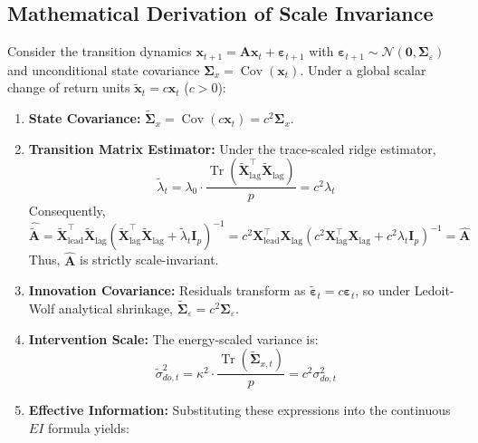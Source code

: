 \documentclass[12pt]{article}
\begin{document}
\subsection{Mathematical Derivation of Scale Invariance}
Consider the transition dynamics $\mathbf{x}_{t+1} = \mathbf{A}\mathbf{x}_t + \boldsymbol{\varepsilon}_{t+1}$ with $\boldsymbol{\varepsilon}_{t+1} \sim \mathcal{N}(\mathbf{0}, \boldsymbol{\Sigma}_\varepsilon)$ and unconditional state covariance $\boldsymbol{\Sigma}_x = \operatorname{Cov}(\mathbf{x}_t)$. Under a global scalar change of return units $\tilde{\mathbf{x}}_t = c \mathbf{x}_t$ ($c > 0$):
\begin{enumerate}
    \item \textbf{State Covariance:} $\tilde{\boldsymbol{\Sigma}}_x = \operatorname{Cov}(c \mathbf{x}_t) = c^2 \boldsymbol{\Sigma}_x$.
    \item \textbf{Transition Matrix Estimator:} Under the trace-scaled ridge estimator,
    \begin{equation}
    \tilde{\lambda}_t = \lambda_0 \cdot \frac{\operatorname{Tr}(\tilde{\mathbf{X}}_{\text{lag}}^\top \tilde{\mathbf{X}}_{\text{lag}})}{p} = c^2 \lambda_t
    \end{equation}
    Consequently,
    \begin{equation}
    \hat{\tilde{\mathbf{A}}} = \tilde{\mathbf{X}}_{\text{lead}}^\top \tilde{\mathbf{X}}_{\text{lag}} \left( \tilde{\mathbf{X}}_{\text{lag}}^\top \tilde{\mathbf{X}}_{\text{lag}} + \tilde{\lambda}_t \mathbf{I}_p \right)^{-1} = c^2 \mathbf{X}_{\text{lead}}^\top \mathbf{X}_{\text{lag}} \left( c^2 \mathbf{X}_{\text{lag}}^\top \mathbf{X}_{\text{lag}} + c^2 \lambda_t \mathbf{I}_p \right)^{-1} = \hat{\mathbf{A}}
    \end{equation}
    Thus, $\hat{\mathbf{A}}$ is strictly scale-invariant.
    \item \textbf{Innovation Covariance:} Residuals transform as $\tilde{\boldsymbol{\varepsilon}}_t = c \boldsymbol{\varepsilon}_t$, so under Ledoit-Wolf analytical shrinkage, $\tilde{\boldsymbol{\Sigma}}_\varepsilon = c^2 \boldsymbol{\Sigma}_\varepsilon$.
    \item \textbf{Intervention Scale:} The energy-scaled variance is:
    \begin{equation}
    \tilde{\sigma}_{do,t}^2 = \kappa^2 \cdot \frac{\operatorname{Tr}(\tilde{\boldsymbol{\Sigma}}_{x,t})}{p} = c^2 \sigma_{do,t}^2
    \end{equation}
    \item \textbf{Effective Information:} Substituting these expressions into the continuous $EI$ formula yields:

\end{enumerate}
\end{document}
